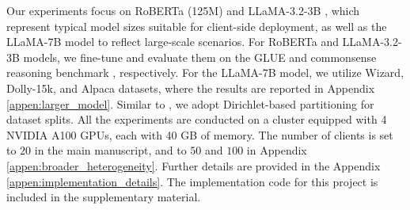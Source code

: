 \documentclass{article} %
\theoremstyle{plain}
\theoremstyle{definition}
\begin{document}
Our experiments focus on RoBERTa (125M) \citep{liu2019roberta} and LLaMA-3.2-3B \citep{llama3}, which represent typical model sizes suitable for client-side deployment, as well as the LLaMA-7B model to reflect large-scale scenarios.
For RoBERTa and LLaMA-3.2-3B models, we fine-tune and evaluate them on the GLUE \citep{wang2018glue} and commonsense reasoning benchmark \citep{hu2023llm}, respectively. For the LLaMA-7B model, we utilize Wizard, Dolly-15k, and Alpaca datasets, where the results are reported in Appendix \ref{appen:larger_model}.
Similar to \citep{zhang2024towards,wang2024flora}, we adopt Dirichlet-based partitioning for dataset splits.
All the experiments are conducted on a cluster equipped with 4 NVIDIA A100 GPUs, each with 40 GB of memory. The number of clients is set to $20$ in the main manuscript, and to $50$ and $100$ in Appendix \ref{appen:broader_heterogeneity}.
Further details are provided in the Appendix \ref{appen:implementation_details}. 
The implementation code for this project is included in the supplementary material.
\end{document}
